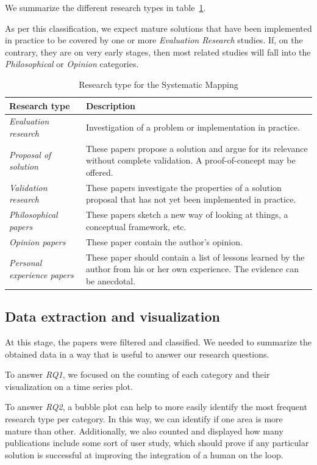 We summarize the different research types in table~\ref{tab:mapping/research_type}.

As per this classification, we expect mature solutions that have been
implemented in practice to be covered by one or more \emph{Evaluation Research}
studies. If, on the contrary, they are on very early stages, then most
related studies will fall into the \emph{Philosophical} or
\emph{Opinion} categories.

\begin{table}[hptb]
  \small
  \begin{tabularx}{\textwidth}{l >{\raggedright\arraybackslash}X}
    \hline
    \textbf{Research type} & \textbf{Description} \\
    \hline
    \textit{Evaluation research} & Investigation of a problem or implementation in practice. \\
    \textit{Proposal of solution} & These papers propose a solution and argue for its relevance without
      complete validation. A proof-of-concept may be offered. \\
    \textit{Validation research} & These papers investigate the properties of a solution proposal that
      has not yet been implemented in practice. \\
    \textit{Philosophical papers} & These papers sketch a new way of looking at things, a conceptual
      framework, etc. \\
    \textit{Opinion papers} & These paper contain the author's opinion. \\
    \textit{Personal experience papers} & These paper should contain a list of lessons learned by the
      author from his or her own experience. The evidence can be anecdotal. \\
  \end{tabularx}
  \caption{Research type for the Systematic Mapping}\label{tab:mapping/research_type}
\end{table}

\subsection{Data extraction and visualization}
At this stage, the papers were filtered and classified. We needed to summarize
the obtained data in a way that is useful to answer our research questions.

To answer \emph{RQ1}, we focused on the counting of each category
and their visualization on a time series plot.

To answer \emph{RQ2}, a bubble plot can help to more easily identify
the most frequent research type per category. In this way, we can identify if
one area is more mature than other. Additionally, we also counted and displayed
how many publications include some sort of user study, which should prove
if any particular solution is successful at improving the integration of a
human on the loop.

